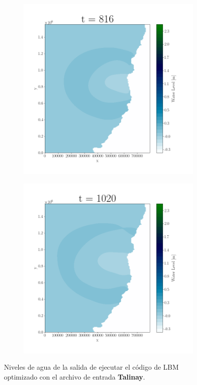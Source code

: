 \begin{figure}[H]
\begin{subfigure}[b]{.4\linewidth}
\includegraphics[width=\linewidth]{Figures/3-5.png}
\caption{}
\end{subfigure}
\begin{subfigure}[b]{.4\linewidth}
\includegraphics[width=\linewidth]{Figures/3-6.png}
\caption{}
\end{subfigure}
\caption{Niveles de agua de la salida de ejecutar el código de LBM optimizado con el archivo de entrada \textbf{Talinay}.}
\label{fig:22}
\end{figure}

